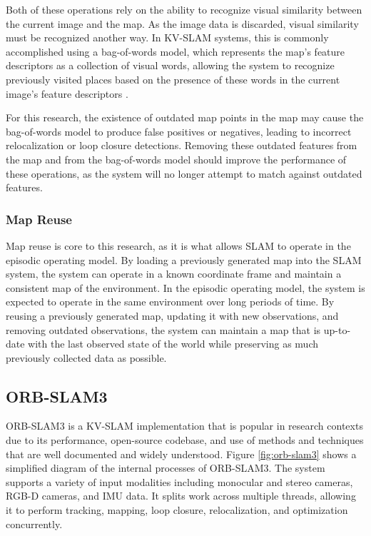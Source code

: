 Both of these operations rely on the ability to recognize visual similarity between the current image and the map. As the image data is discarded, visual similarity must be recognized another way. In KV-SLAM systems, this is commonly accomplished using a bag-of-words model, which represents the map's feature descriptors as a collection of visual words, allowing the system to recognize previously visited places based on the presence of these words in the current image's feature descriptors \cite{galvez-lopezBagsBinaryWords2012}.

For this research, the existence of outdated map points in the map may cause the bag-of-words model to produce false positives or negatives, leading to incorrect relocalization or loop closure detections. Removing these outdated features from the map and from the bag-of-words model should improve the performance of these operations, as the system will no longer attempt to match against outdated features.

\subsubsection{Map Reuse}

Map reuse is core to this research, as it is what allows SLAM to operate in the episodic operating model. By loading a previously generated map into the SLAM system, the system can operate in a known coordinate frame and maintain a consistent map of the environment. In the episodic operating model, the system is expected to operate in the same environment over long periods of time. By reusing a previously generated map, updating it with new observations, and removing outdated observations, the system can maintain a map that is up-to-date with the last observed state of the world while preserving as much previously collected data as possible.

\subsection{ORB-SLAM3}
\label{sec:orb_slam3}

ORB-SLAM3 is a KV-SLAM implementation that is popular in research contexts due to its performance, open-source codebase, and use of methods and techniques that are well documented and widely understood. Figure \ref{fig:orb-slam3} shows a simplified diagram of the internal processes of ORB-SLAM3. The system supports a variety of input modalities including monocular and stereo cameras, RGB-D cameras, and IMU data. It splits work across multiple threads, allowing it to perform tracking, mapping, loop closure, relocalization, and optimization concurrently.

